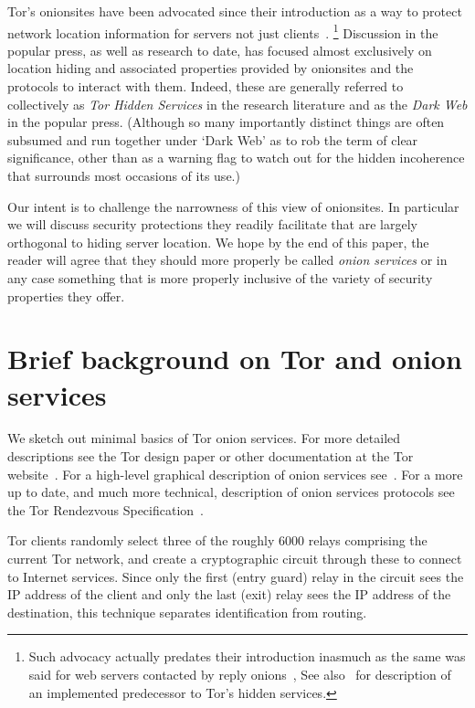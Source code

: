 \documentclass[10pt, conference, compsocconf]{styles/IEEEtran}
\begin{document}
Tor's onionsites have been advocated since their introduction as a
way to protect network location information for servers not just
clients~\cite{tor-design}. \footnote{Such advocacy actually predates
  their introduction inasmuch as the same was said for web servers
  contacted by reply onions~\cite{onion-routing:cacm99}, See
  also~\cite{rewebber} for description of an implemented predecessor
  to Tor's hidden services.}  Discussion in the popular press, as well
as research to date, has focused almost exclusively on location hiding
and associated properties provided by onionsites and the protocols
to interact with them. Indeed, these are generally referred to
collectively as \emph{Tor Hidden Services} in the research literature
and as the \emph{Dark Web} in the popular press. (Although so many
importantly distinct things are often subsumed and run together under
`Dark Web' as to rob the term of clear significance, other than as a
warning flag to watch out for the hidden incoherence that surrounds
most occasions of its use.)

Our intent is to challenge the narrowness of this view of
onionsites. In particular we will discuss security protections they
readily facilitate that are largely orthogonal to hiding server
location. We hope by the end of this paper, the reader will agree that
they should more properly be called \emph{onion services} or in any
case something that is more properly inclusive of the variety of
security properties they offer.

\section{Brief background on Tor and onion services}

We sketch out minimal basics of Tor onion services. For more detailed
descriptions see the Tor design paper or other documentation at the
Tor website~\cite{torproject}. For a high-level graphical description
of onion services see~\cite{tor-hs}. For a more up to date, and much
more technical, description of onion services protocols see the Tor
Rendezvous Specification~\cite{tor-rend-spec}.

Tor clients randomly select three of the roughly 6000 relays
comprising the current Tor network, and create a cryptographic circuit
through these to connect to Internet services. Since only the first
(entry guard) relay in the circuit sees the IP address of the client and
only the last (exit) relay sees the IP address of the destination,
this technique separates identification from routing.
\end{document}
